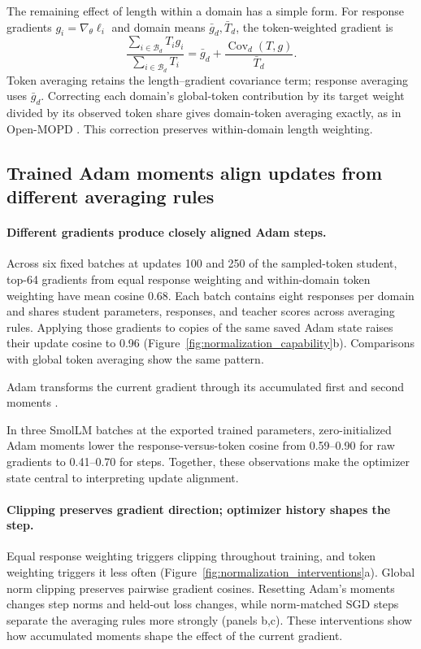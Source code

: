 The remaining effect of length within a domain has a simple form. For response gradients $g_i=\nabla_\theta\ell_i$ and domain means $\bar g_d,\bar T_d$, the token-weighted gradient is
\begin{equation}
\frac{\sum_{i\in\mathcal B_d}T_i g_i}{\sum_{i\in\mathcal B_d}T_i}
=\bar g_d+\frac{\operatorname{Cov}_d(T,g)}{\bar T_d}.
\label{eq:weighting}
\end{equation}
Token averaging retains the length--gradient covariance term; response averaging uses $\bar g_d$. Correcting each domain's global-token contribution by its target weight divided by its observed token share gives domain-token averaging exactly, as in Open-MOPD \citep{gao2026openmopddiagnosingfixingcapability}. This correction preserves within-domain length weighting.

\subsection{Trained Adam moments align updates from different averaging rules}

\paragraph{Different gradients produce closely aligned Adam steps.}
Across six fixed batches at updates 100 and 250 of the sampled-token student, top-64 gradients from equal response weighting and within-domain token weighting have mean cosine 0.68. Each batch contains eight responses per domain and shares student parameters, responses, and teacher scores across averaging rules. Applying those gradients to copies of the same saved Adam state raises their update cosine to 0.96 (Figure~\ref{fig:normalization_capability}b). Comparisons with global token averaging show the same pattern.



Adam transforms the current gradient through its accumulated first and second moments \citep{kingma2015adam}.

In three SmolLM batches at the exported trained parameters, zero-initialized Adam moments lower the response-versus-token cosine from 0.59--0.90 for raw gradients to 0.41--0.70 for steps. Together, these observations make the optimizer state central to interpreting update alignment.

\paragraph{Clipping preserves gradient direction; optimizer history shapes the step.}
Equal response weighting triggers clipping throughout training, and token weighting triggers it less often (Figure~\ref{fig:normalization_interventions}a). Global norm clipping preserves pairwise gradient cosines. Resetting Adam's moments changes step norms and held-out loss changes, while norm-matched SGD steps separate the averaging rules more strongly (panels b,c). These interventions show how accumulated moments shape the effect of the current gradient.

